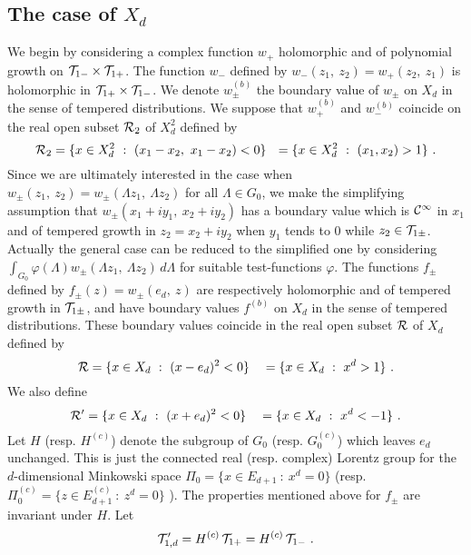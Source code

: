 \documentclass[a4paper,a4paper]{article}
\def\RR{\mathbb R}
\def\CC{{\cal C}}
\def\RR{{\cal R}}
\def\TT{{\cal T}}
\def \vhi{\varphi}
\def\amb{E_{d+1}}
\def\ambc{\amb^{(c)}}
\begin{document}
\subsection{The case of $X_d$}
\label{x_d2pt}
We begin by considering a complex function $w_+$ holomorphic and of
polynomial growth on $\TT_{1-}\times \TT_{1+}$. The function $w_-$
defined by $w_-(z_1,\ z_2) = w_+(z_2,\ z_1)$ is holomorphic in
$\TT_{1+}\times \TT_{1-}$. We denote $w^{(b)}_\pm$ the boundary
value of $w_\pm$ on $X_d$ in the sense of tempered distributions.
We suppose that $w^{(b)}_+$ and $w^{(b)}_-$ coincide on the real
open subset $\RR_2$ of $X_d^2$ defined by
\begin{equation}
\RR_2 = \{x \in X_d^2\ :\ (x_1 - x_2,\ x_1 - x_2) < 0\}
\ \ = \{x \in X_d^2\ :\ (x_1,x_2) > 1\}\ .
\label{a2pt.1}\end{equation}
Since we are ultimately interested in the case when
$w_\pm(z_1,\ z_2) = w_\pm(\Lambda z_1,\ \Lambda z_2)$ for all
$\Lambda \in G_0$, we make the simplifying assumption that
$w_\pm(x_1+iy_1,\ x_2+iy_2)$ has a boundary value which is
$\CC^\infty$ in $x_1$ and of tempered growth in $z_2 = x_2+iy_2$
when $y_1$ tends to 0 while $z_2 \in \TT_{1\pm}$. Actually the
general case can be reduced to the simplified one by considering
$\int_{G_0} \vhi(\Lambda) w_\pm(\Lambda z_1,\ \Lambda z_2)\,d\Lambda$
for suitable test-functions $\vhi$. The functions $f_\pm$ defined by
$f_\pm(z) = w_\pm(e_d,\ z)$ are respectively holomorphic and of tempered
growth in $\TT_{1\pm}$, and have boundary values $f^{(b)}$ on $X_d$
in the sense of tempered distributions. These boundary values
coincide in the real open subset $\RR$ of $X_d$ defined by
\begin{equation}
\RR = \{x \in X_d\ :\ (x-e_d)^2 < 0\}\ \ \ =
\{x \in X_d\ :\ x^d > 1\}\ .
\label{a2pt.2}\end{equation}
We also define
\begin{equation}
\RR' = \{x \in X_d\ :\ (x+e_d)^2 < 0\}\ \ \ =
\{x \in X_d\ :\ x^d < -1\}\ .
\label{a2pt.2.1}\end{equation}
Let $H$ (resp. $H^{(c)}$) denote the subgroup of $G_0$ (resp. $G_0^{(c)}$)
which leaves $e_d$ unchanged. This is just the connected real
(resp. complex) Lorentz group for the $d$-dimensional Minkowski space
$\Pi_0 = \{x \in \amb\ :\ x^d = 0\}$
(resp. $\Pi_0^{(c)} = \{z \in \ambc\ :\ z^d = 0\}$ ). The properties
mentioned above for $f_\pm$ are invariant under $H$. Let
\begin{equation}
\TT'_{1,d} = H^{(c)}\,\TT_{1+} = H^{(c)}\,\TT_{1-}\ .
\label{a2pt.3}\end{equation}
\end{document}
